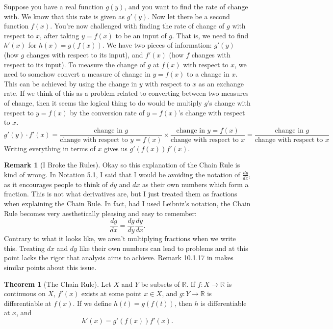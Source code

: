 \documentclass{article}
\newcommand{\R}{\mathbb{R}}
\theoremstyle{definition}
\newtheorem{theorem}{Theorem}[section]
\newtheorem{remark}{Remark}[section]
\begin{document}
Suppose you have a real function $ g(y) $, and you want to find the rate of change with. We know that this rate is given as $ g'(y) $. Now let there be a second function $ f(x) $. You're now challenged with finding the rate of change of $ g $ with respect to $ x $, after taking $ y=f(x) $ to be an input of $ g $. That is, we need to find $ h'(x) $ for $ h(x)=g(f(x)) $. We have two pieces of information:  $ g'(y) $ (how $ g $ changes with respect to its input), and $ f'(x) $ (how $ f $ changes with respect to its input). To measure the change of $ g $ at $ f(x) $ with respect to $ x $, we need to somehow convert a measure of change in $ y=f(x) $ to a change in $ x $. This can be achieved by using the change in $ y $ with respect to $ x $ as an exchange rate. If we think of this as a problem related to converting between two measures of change, then it seems the logical thing to do would be multiply $ g $'s change with respect to $ y=f(x) $ by the conversion rate of $ y=f(x) $'s change with respect to $ x $. 
$$g'(y)\cdot f'(x)=\frac{\text{change in }g}{{\text{change with respect to }y=f(x)}}\times \frac{\text{change in }y=f(x)}{\text{change with respect to }x}=\frac{\text{change in }g}{\text{change with respect to }x} $$ Writing everything in terms of $ x $ gives us $ g'(f(x))f'(x)$.
\begin{remark}[I Broke the Rules]
	Okay so this explanation of the Chain Rule is kind of wrong. In Notation 5.1, I said that I would be avoiding the notation of $ \frac{dy}{dx} $, as it encourages people to think of $ dy $ and $ dx $ as their own numbers which form a fraction. This is not what derivatives are, but I just treated them as fractions when explaining the Chain Rule. In fact, had I used Leibniz's notation, the Chain Rule becomes very aesthetically pleasing and easy to remember: $$ \frac{dg}{dx}=\frac{dg}{dy}\frac{dy}{dx} .$$ Contrary to what it looks like, we aren't multiplying fractions when we write this. Treating $ dx $ and $ dy $ like their own numbers can lead to problems and at this point lacks the rigor that analysis aims to achieve. Remark 10.1.17 in \cite{tao2006analysis} makes similar points about this issue. 
\end{remark}
\begin{theorem}[The Chain Rule]
Let $ X $ and $ Y $ be subsets of $ \R $. If $ f:X\to\R $ is continuous on $ X $, $ f'(x) $ exists at some point $ x\in X $, and $ g:Y\to \R $ is differentiable at $ f(x) $. If we define $h(t)=g(f(t)) $, then $ h $ is differentiable at $ x $, and $$ h'(x)=g'(f(x))f'(x).$$
\end{theorem}
\end{document}
